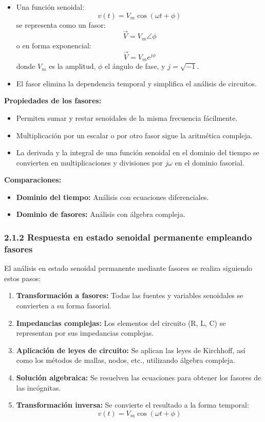 \documentclass[12pt]{article}
\begin{document}
\begin{itemize}
    \item Una función senoidal:
    \[
        v(t) = V_m \cos(\omega t + \phi)
    \]
    se representa como un fasor:
    \[
        \vec{V} = V_m \angle \phi
    \]
    o en forma exponencial:
    \[
        \vec{V} = V_m e^{j\phi}
    \]
    donde $V_m$ es la amplitud, $\phi$ el ángulo de fase, y $j = \sqrt{-1}$.
    \item El fasor elimina la dependencia temporal y simplifica el análisis de circuitos.
\end{itemize}

\textbf{Propiedades de los fasores:}
\begin{itemize}
    \item Permiten sumar y restar senoidales de la misma frecuencia fácilmente.
    \item Multiplicación por un escalar o por otro fasor sigue la aritmética compleja.
    \item La derivada y la integral de una función senoidal en el dominio del tiempo se convierten en multiplicaciones y divisiones por $j\omega$ en el dominio fasorial.
\end{itemize}

\textbf{Comparaciones:}
\begin{itemize}
    \item \textbf{Dominio del tiempo:} Análisis con ecuaciones diferenciales.
    \item \textbf{Dominio de fasores:} Análisis con álgebra compleja.
\end{itemize}

\vspace{0.5cm}
\subsubsection*{2.1.2 Respuesta en estado senoidal permanente empleando fasores}

El análisis en estado senoidal permanente mediante fasores se realiza siguiendo estos pasos:

\begin{enumerate}[label=\arabic*.]
    \item \textbf{Transformación a fasores:} Todas las fuentes y variables senoidales se convierten a su forma fasorial.
    \item \textbf{Impedancias complejas:} Los elementos del circuito (R, L, C) se representan por sus impedancias complejas.
    \item \textbf{Aplicación de leyes de circuito:} Se aplican las leyes de Kirchhoff, así como los métodos de mallas, nodos, etc., utilizando álgebra compleja.
    \item \textbf{Solución algebraica:} Se resuelven las ecuaciones para obtener los fasores de las incógnitas.
    \item \textbf{Transformación inversa:} Se convierte el resultado a la forma temporal:
    \[
        v(t) = V_m \cos(\omega t + \phi)
    \]
\end{enumerate}
\end{document}
